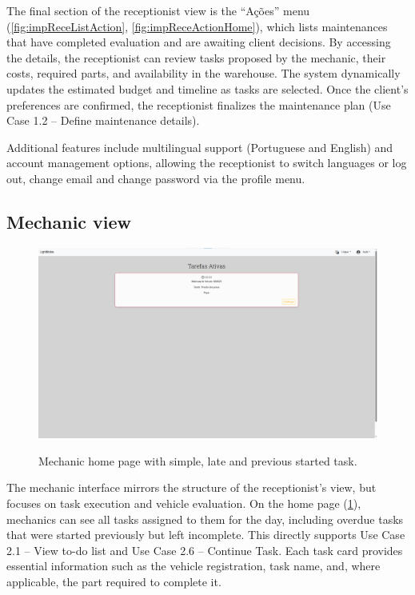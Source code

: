 The final section of the receptionist view is the “Ações” menu (\ref{fig:impReceListAction}, \ref{fig:impReceActionHome}), which lists maintenances that have completed evaluation and are awaiting client decisions. By accessing the details, the receptionist can review tasks proposed by the mechanic, their costs, required parts, and availability in the warehouse. The system dynamically updates the estimated budget and timeline as tasks are selected. Once the client's preferences are confirmed, the receptionist finalizes the maintenance plan (Use Case 1.2 – Define maintenance details).



Additional features include multilingual support (Portuguese and English) and account management options, allowing the receptionist to switch languages or log out, change email and change password via the profile menu.


\subsection{Mechanic view}


\begin{figure}[h]
  \caption{Mechanic home page with simple, late and previous started task.}
  \centering
  \includegraphics[width=\textwidth]{figs/Implementation/mechanic/HomeContinueLate}
  \label{fig:HomeContinueLate}
\end{figure}




The mechanic interface mirrors the structure of the receptionist's view, but focuses on task execution and vehicle evaluation. On the home page (\ref{fig:HomeContinueLate}), mechanics can see all tasks assigned to them for the day, including overdue tasks that were started previously but left incomplete. This directly supports Use Case 2.1 – View to-do list and Use Case 2.6 – Continue Task. Each task card provides essential information such as the vehicle registration, task name, and, where applicable, the part required to complete it.


